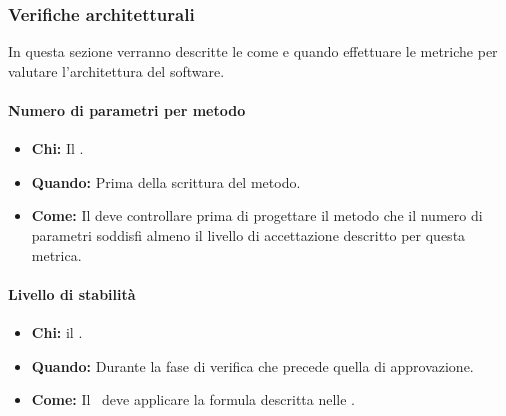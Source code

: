 \subsubsection{Verifiche architetturali}
In questa sezione verranno descritte le come e quando effettuare le metriche per valutare l'architettura del software.

\paragraph{Numero di parametri per metodo}
\begin{itemize}
\item \textbf{Chi:} Il \Prog.
\item \textbf{Quando:} Prima della scrittura del metodo.
\item \textbf{Come:} Il \Prog deve controllare prima di progettare il metodo che il numero di parametri soddisfi almeno il livello di accettazione descritto per questa metrica.
\end{itemize}

\paragraph{Livello di stabilità}
\begin{itemize}
\item \textbf{Chi:} il \Ver.
\item \textbf{Quando:} Durante la fase di verifica che precede quella di approvazione.
\item \textbf{Come:} Il \Ver\ deve applicare la formula descritta nelle \NdP.
\end{itemize}